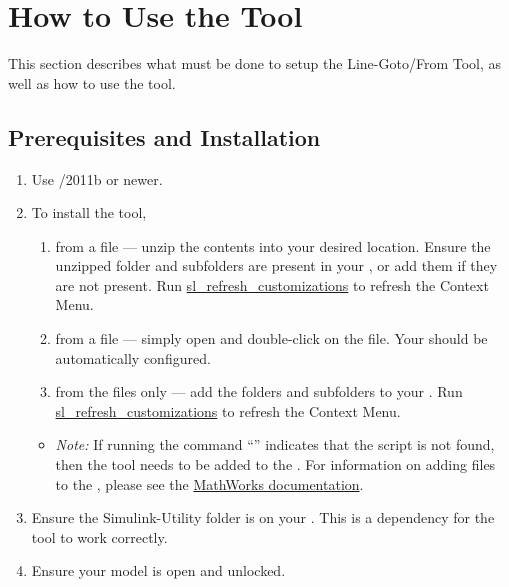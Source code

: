 \documentclass{article}
\makeatletter
\newcommand{\ToolName}{Line-Goto/From Tool\@\xspace}
\makeatother
\begin{document}
%
	
\section{How to Use the Tool}
This section describes what must be done to setup the \ToolName, as well as how to use the tool.

\subsection{Prerequisites and Installation}

\begin{enumerate}
  \item Use \Matlab/\Simulink 2011b or newer.
	\item To install the tool,
	\begin{enumerate}
		\item from a  file --- unzip the contents into your desired location. Ensure the unzipped folder and subfolders are present in your \mpath, or add them if they are not present. Run \href{https://www.mathworks.com/help/simulink/ug/registering-customizations.html}{sl\_refresh\_customizations} to refresh the Context Menu. 
		\item from a  file --- simply open \Matlab and double-click on the file. Your \mpath should be automatically configured.
		\item from the files only --- add the folders and subfolders to your \mpath. Run \href{https://www.mathworks.com/help/simulink/ug/registering-customizations.html}{sl\_refresh\_customizations} to refresh the Context Menu.
	\end{enumerate}
	\begin{itemize}
		\item \textit{Note:} If running the command ``'' indicates that the script is not found, then the tool needs to be added to the \mpath.
		For information on adding files to the \mpath, please see the \href{https://www.mathworks.com/help/matlab/matlab_env/add-remove-or-reorder-folders-on-the-search-path.html}{MathWorks documentation}.
	\end{itemize}
	\item Ensure the Simulink-Utility folder is on your \mpath. This is a dependency for the tool to work correctly.
	\item Ensure your model is open and unlocked.
\end{enumerate}
\end{document}
